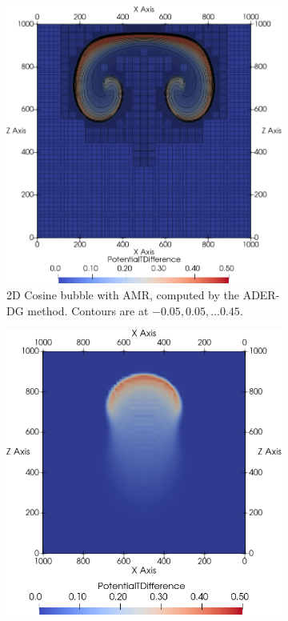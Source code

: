 \documentclass[runningheads]{llncs}
\begin{document}
\begin{figure}[tb]
  \begin{subfigure}[t]{0.45\columnwidth}
  \includegraphics[width=\textwidth]{screenshots/cosine_bubble_2d_dg.png}
  \caption{\label{fig:cosine-bubble-2d-dg-amr}%
  2D Cosine bubble with AMR, computed by the ADER-DG method.
  Contours are at $-0.05, 0.05, \ldots 0.45$.
  }
  \end{subfigure}\quad
  \begin{subfigure}[t]{0.45\columnwidth}
  \includegraphics[width=1\textwidth]{screenshots/cosine_bubble_3d_dg.png}

\end{subfigure}
\end{figure}
\end{document}
